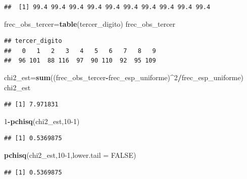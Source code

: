 \documentclass[
]{article}
\newenvironment{Shaded}{\begin{snugshade}}{\end{snugshade}}
\newcommand{\DataTypeTok}[1]{\textcolor[rgb]{0.13,0.29,0.53}{#1}}
\newcommand{\DecValTok}[1]{\textcolor[rgb]{0.00,0.00,0.81}{#1}}
\newcommand{\KeywordTok}[1]{\textcolor[rgb]{0.13,0.29,0.53}{\textbf{#1}}}
\newcommand{\NormalTok}[1]{#1}
\newcommand{\OperatorTok}[1]{\textcolor[rgb]{0.81,0.36,0.00}{\textbf{#1}}}
\newcommand{\OtherTok}[1]{\textcolor[rgb]{0.56,0.35,0.01}{#1}}
\begin{document}
\begin{verbatim}
##  [1] 99.4 99.4 99.4 99.4 99.4 99.4 99.4 99.4 99.4 99.4
\end{verbatim}

\begin{Shaded}
\begin{Highlighting}[]
\NormalTok{frec\_obs\_tercer=}\KeywordTok{table}\NormalTok{(tercer\_digito)}
\NormalTok{frec\_obs\_tercer}
\end{Highlighting}
\end{Shaded}

\begin{verbatim}
## tercer_digito
##   0   1   2   3   4   5   6   7   8   9 
##  96 101  88 116  97  90 110  92  95 109
\end{verbatim}

\begin{Shaded}
\begin{Highlighting}[]
\NormalTok{chi2\_est=}\KeywordTok{sum}\NormalTok{((frec\_obs\_tercer}\OperatorTok{{-}}\NormalTok{frec\_esp\_uniforme)}\OperatorTok{\^{}}\DecValTok{2}\OperatorTok{/}\NormalTok{frec\_esp\_uniforme)}
\NormalTok{chi2\_est}
\end{Highlighting}
\end{Shaded}

\begin{verbatim}
## [1] 7.971831
\end{verbatim}

\begin{Shaded}
\begin{Highlighting}[]
\DecValTok{1}\OperatorTok{{-}}\KeywordTok{pchisq}\NormalTok{(chi2\_est,}\DecValTok{10{-}1}\NormalTok{)}
\end{Highlighting}
\end{Shaded}

\begin{verbatim}
## [1] 0.5369875
\end{verbatim}

\begin{Shaded}
\begin{Highlighting}[]
\KeywordTok{pchisq}\NormalTok{(chi2\_est,}\DecValTok{10{-}1}\NormalTok{,}\DataTypeTok{lower.tail =} \OtherTok{FALSE}\NormalTok{)}
\end{Highlighting}
\end{Shaded}

\begin{verbatim}
## [1] 0.5369875
\end{verbatim}
\end{document}
